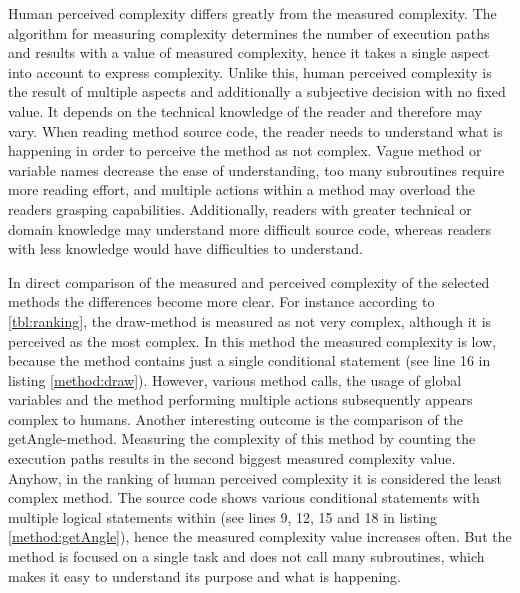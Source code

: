 \documentclass[conference]{IEEEtran}
\newcommand{\lref}[1]{listing \ref{#1}}%
\begin{document}
Human perceived complexity differs greatly from the measured complexity. The algorithm for measuring complexity determines the number of execution paths and results with a value of measured complexity, hence it takes a single aspect into account to express complexity. Unlike this, human perceived complexity is the result of multiple aspects and additionally a subjective decision with no fixed value. It depends on the technical knowledge of the reader and therefore may vary. When reading method source code, the reader needs to understand what is happening in order to perceive the method as not complex. Vague method or variable names decrease the ease of understanding, too many subroutines require more reading effort, and multiple actions within a method may overload the readers grasping capabilities. Additionally, readers with greater technical or domain knowledge may understand more difficult source code, whereas readers with less knowledge would have difficulties to understand. 

In direct comparison of the measured and perceived complexity of the selected methods the differences become more clear. For instance according to \cref{tbl:ranking}, the draw-method is measured as not very complex, although it is perceived as the most complex. In this method the measured complexity is low, because the method contains just a single conditional statement (see line 16 in \lref{method:draw}). However, various method calls, the usage of global variables and the method performing multiple actions subsequently appears complex to humans. Another interesting outcome is the comparison of the getAngle-method. Measuring the complexity of this method by counting the execution paths results in the second biggest measured complexity value. Anyhow, in the ranking of human perceived complexity it is considered the least complex method. The source code shows various conditional statements with multiple logical statements within (see lines 9, 12, 15 and 18 in \lref{method:getAngle}), hence the measured complexity value increases often. But the method is focused on a single task and does not call many subroutines, which makes it easy to understand its purpose and what is happening.
\end{document}
